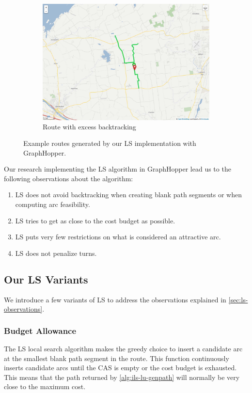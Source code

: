 \documentclass[honors]{union-cs-thesis}
\begin{document}
\begin{figure}
\begin{center}
\begin{subfigure}{0.48\linewidth}
\includegraphics[width=\textwidth]{figs/ls-route3}
\caption{Route with excess backtracking}
\label{fig:ls-route3}
\end{subfigure}
\end{center}
\caption{Example routes generated by our LS implementation with GraphHopper.}
\label{fig:ls-routes}
\end{figure}

Our research implementing the LS algorithm in GraphHopper lead us to the following observations about the algorithm:
\begin{enumerate}
    \item LS does not avoid backtracking when creating blank path segments or when computing arc feasibility.
    \item LS tries to get as close to the cost budget as possible.
    \item LS puts very few restrictions on what is considered an attractive arc.
    \item LS does not penalize turns.
\end{enumerate}

\subsection{Our LS Variants}
We introduce a few variants of LS to address the observations explained in \cref{sec:ls-observations}.

\subsubsection{Budget Allowance}
The LS local search algorithm makes the greedy choice to insert a candidate arc at the smallest blank path segment in the route. This function continuously inserts candidate arcs until the CAS is empty or the cost budget is exhausted. This means that the path returned by \cref{alg:ils-lu-genpath} will normally be very close to the maximum cost. 
\end{document}
